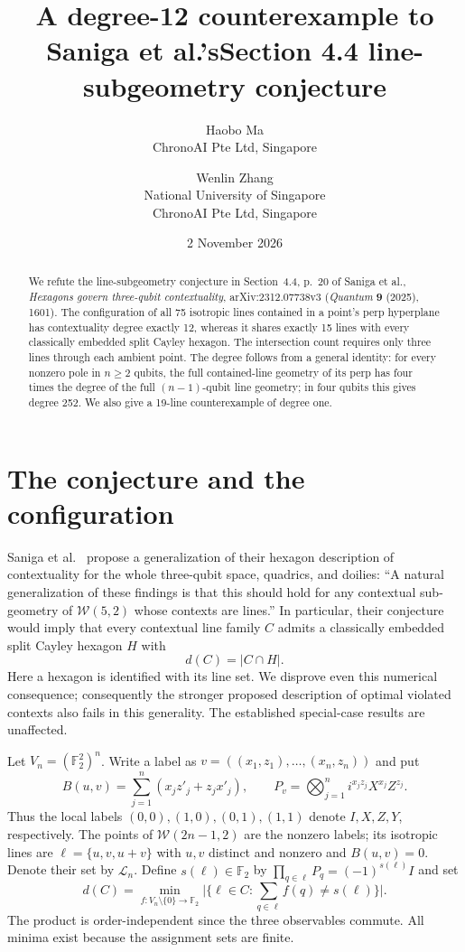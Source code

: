 \documentclass[10pt]{article}
\title{A degree-12 counterexample to Saniga et al.'s\newline Section 4.4 line-subgeometry conjecture}
\author{Haobo Ma\\{\small ChronoAI Pte Ltd, Singapore}
\and Wenlin Zhang\\{\small National University of Singapore}\\{\small ChronoAI Pte Ltd, Singapore}}
\date{2 November 2026}
\newcommand{\FF}{\mathbb F_2}
\newcommand{\WW}{\mathcal W}
\newcommand{\LL}{\mathcal L}
\begin{document}
\maketitle
\begin{abstract}
We refute the line-subgeometry conjecture in Section~4.4, p.~20 of Saniga et al.,
\emph{Hexagons govern three-qubit contextuality}, arXiv:2312.07738v3
(\emph{Quantum} \textbf{9} (2025), 1601).
The configuration of all 75 isotropic lines contained in a point's perp
hyperplane has contextuality degree exactly 12, whereas it shares exactly 15
lines with every classically embedded split Cayley hexagon.
The intersection count requires only three lines through each ambient point.
The degree follows from a general identity: for every nonzero pole in $n\ge2$
qubits, the full contained-line geometry of its perp has four times the degree
of the full $(n-1)$-qubit line geometry; in four qubits this gives degree 252.
We also give a 19-line counterexample of degree one.
\end{abstract}

\section{The conjecture and the configuration}
Saniga et al.~\cite[Section~4.4, p.~20]{saniga} propose a generalization of their
hexagon description of contextuality for the whole three-qubit space, quadrics,
and doilies: ``A natural generalization of these findings is that this should
hold for any contextual sub-geometry of $\WW(5,2)$ whose contexts are lines.''
In particular, their conjecture would imply that every contextual line family
$C$ admits a classically embedded split Cayley hexagon $H$ with
\begin{equation}\label{eq:conjecture}
 d(C)=|C\cap H|.
\end{equation}
Here a hexagon is identified with its line set. We disprove even this numerical
consequence; consequently the stronger proposed description of optimal violated
contexts also fails in this generality.
The established special-case results are unaffected.

Let $V_n=(\FF^2)^n$. Write a label as
$v=((x_1,z_1),\ldots,(x_n,z_n))$ and put
\[
 B(u,v)=\sum_{j=1}^n(x_jz'_j+z_jx'_j),\qquad
 P_v=\bigotimes_{j=1}^n i^{x_jz_j}X^{x_j}Z^{z_j}.
\]
Thus the local labels $(0,0),(1,0),(0,1),(1,1)$ denote $I,X,Z,Y$,
respectively. The points of $\WW(2n-1,2)$ are the nonzero labels; its
isotropic lines are $\ell=\{u,v,u+v\}$ with $u,v$ distinct and nonzero and
$B(u,v)=0$. Denote their set by $\LL_n$. Define $s(\ell)\in\FF$ by
$\prod_{q\in\ell}P_q=(-1)^{s(\ell)}I$ and set
\[
 d(C)=\min_{f:V_n\setminus\{0\}\to\FF}
       \bigl|\{\ell\in C:\textstyle\sum_{q\in\ell}f(q)\ne s(\ell)\}\bigr|.
\]
The product is order-independent since the three observables commute.
All minima exist because the assignment sets are finite.
\end{document}
